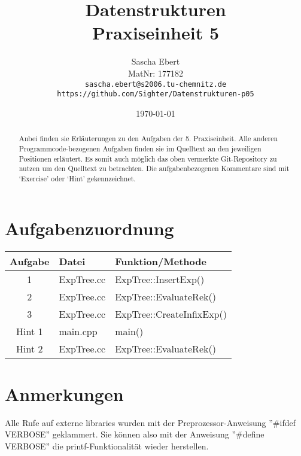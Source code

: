 \documentclass{article}
\title{Datenstrukturen\\Praxiseinheit 5}
\author
{
	Sascha Ebert\\
	MatNr: 177182\\
	\texttt{sascha.ebert@s2006.tu-chemnitz.de}\\
	\texttt{https://github.com/Sighter/Datenstrukturen-p05}\\
}
\date{\today}
\begin{document}
\maketitle

\begin{abstract}
Anbei finden sie Erläuterungen zu den Aufgaben der 5. Praxiseinheit.
Alle anderen Programmcode-bezogenen Aufgaben finden sie im Quelltext an den jeweiligen Positionen
erläutert. Es somit auch möglich das oben vermerkte Git-Repository zu nutzen um den Quelltext
zu betrachten. Die aufgabenbezogenen Kommentare sind mit `Exercise' oder `Hint' gekennzeichnet.
\end{abstract}

\section*{Aufgabenzuordnung}
\begin{tabular}{ c l l }
  Aufgabe & Datei & Funktion/Methode\\
  \hline
  1 & ExpTree.cc & ExpTree::InsertExp()\\
  2 & ExpTree.cc & ExpTree::EvaluateRek()\\
  3 & ExpTree.cc & ExpTree::CreateInfixExp()\\
  \hline
  Hint 1 & main.cpp & main()\\
  Hint 2 & ExpTree.cc & ExpTree::EvaluateRek()\\
\end{tabular}

\section*{Anmerkungen}
Alle Rufe auf externe libraries wurden mit der Preprozessor-Anweisung ''\#ifdef VERBOSE'' geklammert.
Sie können also mit der Anweisung ''\#define VERBOSE'' die printf-Funktionalität wieder herstellen.
\end{document}
